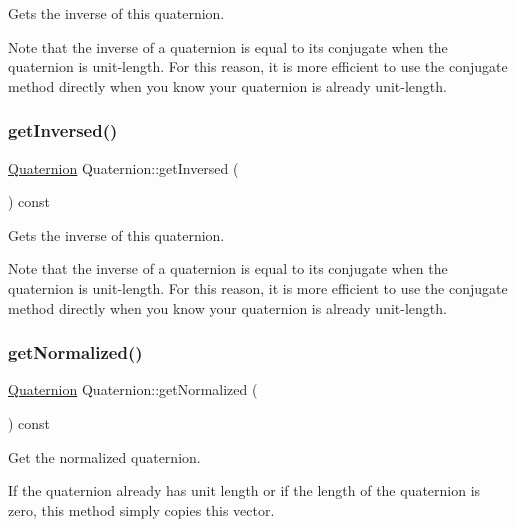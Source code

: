 Gets the inverse of this quaternion.

Note that the inverse of a quaternion is equal to its conjugate when the quaternion is unit-\/length. For this reason, it is more efficient to use the conjugate method directly when you know your quaternion is already unit-\/length. \mbox{\label{classQuaternion_acab26dc0925530cf5d58c92e5fbb9e5a}} 
\subsubsection{\texorpdfstring{get\+Inversed()}{getInversed()}\hspace{0.1cm}{\footnotesize\ttfamily [2/2]}}
{\footnotesize\ttfamily \hyperlink{classQuaternion}{Quaternion} Quaternion\+::get\+Inversed (\begin{DoxyParamCaption}{ }\end{DoxyParamCaption}) const}

Gets the inverse of this quaternion.

Note that the inverse of a quaternion is equal to its conjugate when the quaternion is unit-\/length. For this reason, it is more efficient to use the conjugate method directly when you know your quaternion is already unit-\/length. \mbox{\label{classQuaternion_a203c9c6bf25dcd25bfc25fbe17ec4481}} 
\subsubsection{\texorpdfstring{get\+Normalized()}{getNormalized()}\hspace{0.1cm}{\footnotesize\ttfamily [1/2]}}
{\footnotesize\ttfamily \hyperlink{classQuaternion}{Quaternion} Quaternion\+::get\+Normalized (\begin{DoxyParamCaption}{ }\end{DoxyParamCaption}) const}

Get the normalized quaternion.

If the quaternion already has unit length or if the length of the quaternion is zero, this method simply copies this vector. \mbox{\label{classQuaternion_a203c9c6bf25dcd25bfc25fbe17ec4481}} 

